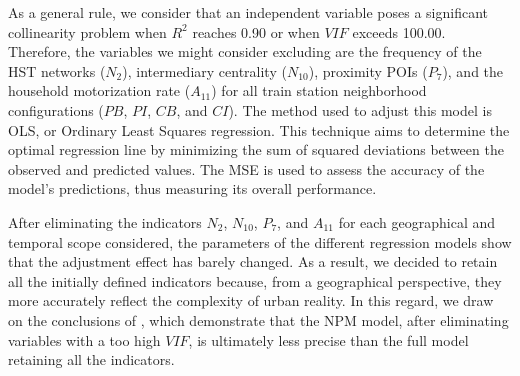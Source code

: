 \begin{refsegment}

As a general rule, we consider that an independent variable poses a significant collinearity problem when \(R^{2}\) reaches 0.90 or when \(VIF\) exceeds 100.00. Therefore, the variables we might consider excluding are the frequency of the \acrshort{HST} networks (\(N_{2}\)), intermediary centrality (\(N_{10}\)), proximity \acrshort{POIs} (\(P_{7}\)), and the household motorization rate (\(A_{11}\)) for all train station neighborhood configurations (\(PB\), \(PI\), \(CB\), and \(CI\)). The method used to adjust this model is \acrfull{OLS}, or Ordinary Least Squares regression. This technique aims to determine the optimal regression line by minimizing the sum of squared deviations between the observed and predicted values. The \acrfull{MSE} is used to assess the accuracy of the model's predictions, thus measuring its overall performance.%

After eliminating the indicators \(N_{2}\), \(N_{10}\), \(P_{7}\), and \(A_{11}\) for each geographical and temporal scope considered, the parameters of the different regression models show that the adjustment effect has barely changed. As a result, we decided to retain all the initially defined indicators because, from a geographical perspective, they more accurately reflect the complexity of urban reality. In this regard, we draw on the conclusions of \textcolor{blue}{\textcite[16]{cao_coordination_2020}}, which demonstrate that the \acrshort{NPM} model, after eliminating variables with a too high \(VIF\), is ultimately less precise than the full model retaining all the indicators.%


\end{refsegment}
